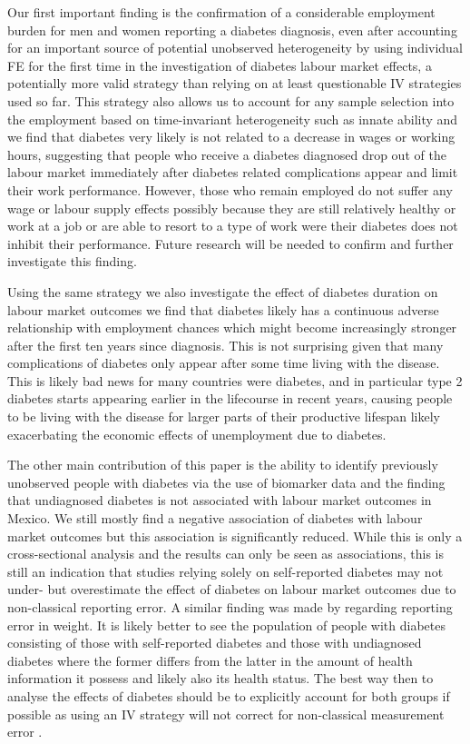 \documentclass[12pt,english,british]{article}
\begin{document}
Our first important finding is the confirmation of a considerable employment burden for men and women reporting a diabetes diagnosis, even after accounting for an important source of potential unobserved heterogeneity by using individual \ac{FE} for the first time in the investigation of diabetes labour market effects, a potentially more valid strategy than relying on at least questionable \ac{IV} strategies used so far. This strategy also allows us to account for any sample selection into the employment based on time-invariant heterogeneity such as innate ability and we find that diabetes very likely is not related to a decrease in wages or working hours, suggesting that people who receive a diabetes diagnosed drop out of the labour market immediately after diabetes related complications appear and limit their work performance. However, those who remain employed do not suffer any wage or labour supply effects possibly  because they are still relatively healthy or work at a job or are able to resort to a type of work were their diabetes does not inhibit their performance. Future research will be needed to confirm and further investigate this finding.

Using the same strategy we also investigate the effect of diabetes duration on labour market outcomes we find that diabetes likely has a continuous adverse relationship with employment chances which might become increasingly stronger after the first ten years since diagnosis. This is not surprising given that many complications of diabetes only appear after some time living with the disease. This is likely bad news for many countries were diabetes, and in particular type 2 diabetes starts appearing earlier in the lifecourse in recent years, causing people to be living with the disease for larger parts of their productive lifespan likely exacerbating the economic effects of unemployment due to diabetes. 

The other main contribution of this paper is the ability to identify previously unobserved people with diabetes via the use of biomarker data and the finding that undiagnosed
diabetes is not associated with labour market outcomes in Mexico. We still mostly find a negative association of diabetes with labour market outcomes but this association is significantly reduced. While this is only a cross-sectional analysis and the results can only be seen as associations, this is still an indication that studies relying solely on self-reported diabetes may not under- but overestimate the effect of diabetes on labour market outcomes due to non-classical reporting error. A similar finding was made by \citet{Cawley2015} regarding reporting error in weight. It is likely better to see the population of people with diabetes consisting of those with self-reported diabetes and those with undiagnosed diabetes where the former differs from the latter in the amount of health information it possess and likely also its health status. The best way then to analyse the effects of diabetes should be to explicitly account for both groups if possible as using an \ac{IV} strategy will not correct for non-classical measurement error \citep{Cawley2015}.
\end{document}
